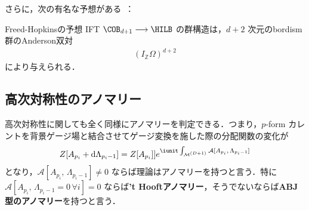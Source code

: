 \documentclass[TQFT_main]{subfiles}
\begin{document}
さらに，次の有名な予想がある~\cite{FreedHopkins_2021}：

\begin{myconj}[label=conj:Freed-Hopkins]{Freed-Hopkinsの予想}
    IFT $\COB_{d+1} \lto \HILB$ の群構造は，$d+2$ 次元のbordism群のAnderson双対
    \begin{align}
        (I_{\mathbb{Z}} \Omega)^{d+2}
    \end{align}
    により与えられる．
\end{myconj}


\subsection{高次対称性のアノマリー}

高次対称性に関しても全く同様にアノマリーを判定できる．つまり，$p$-form カレントを背景ゲージ場と結合させてゲージ変換を施した際の分配関数の変化が
\begin{align}
    Z[A_{p_i} + \dd{\Lambda_{p_i-1}}] = Z[A_{p_i}]] e^{\iunit \int_{\mfdcal{M}{D+1}} \mathcal{A}[A_{p_i},\, \Lambda_{p_i-1}]}
\end{align}
となり，$\mathcal{A}[A_{p_i},\, \Lambda_{p_i-1}] \neq 0$ ならば理論はアノマリーを持つと言う．特に $\mathcal{A}[A_{p_i},\, \Lambda_{p_i-1} = 0\, \forall i] = 0$ ならば\textbf{'t Hooftアノマリー}，そうでないならば\textbf{ABJ型のアノマリー}を持つと言う．
\end{document}
